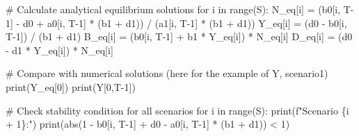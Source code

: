 \documentclass[
  letterpaper,
  DIV=11,
  numbers=noendperiod]{scrreprt}
\newenvironment{Shaded}{\begin{snugshade}}{\end{snugshade}}
\newcommand{\BuiltInTok}[1]{\textcolor[rgb]{0.00,0.23,0.31}{#1}}
\newcommand{\CommentTok}[1]{\textcolor[rgb]{0.37,0.37,0.37}{#1}}
\newcommand{\ControlFlowTok}[1]{\textcolor[rgb]{0.00,0.23,0.31}{#1}}
\newcommand{\DecValTok}[1]{\textcolor[rgb]{0.68,0.00,0.00}{#1}}
\newcommand{\KeywordTok}[1]{\textcolor[rgb]{0.00,0.23,0.31}{#1}}
\newcommand{\NormalTok}[1]{\textcolor[rgb]{0.00,0.23,0.31}{#1}}
\newcommand{\OperatorTok}[1]{\textcolor[rgb]{0.37,0.37,0.37}{#1}}
\newcommand{\SpecialCharTok}[1]{\textcolor[rgb]{0.37,0.37,0.37}{#1}}
\newcommand{\SpecialStringTok}[1]{\textcolor[rgb]{0.13,0.47,0.30}{#1}}
\begin{document}
\begin{tcolorbox}[enhanced jigsaw, titlerule=0mm, breakable, bottomrule=.15mm, toprule=.15mm, colbacktitle=quarto-callout-note-color!10!white, rightrule=.15mm, toptitle=1mm, opacityback=0, left=2mm, coltitle=black, title=\textcolor{quarto-callout-note-color}{\faInfo}\hspace{0.5em}{Python code}, colframe=quarto-callout-note-color-frame, opacitybacktitle=0.6, leftrule=.75mm, bottomtitle=1mm, arc=.35mm, colback=white]

\begin{Shaded}
\begin{Highlighting}[]

\CommentTok{\# Calculate analytical equilibrium solutions }
\ControlFlowTok{for}\NormalTok{ i }\KeywordTok{in} \BuiltInTok{range}\NormalTok{(S):}
\NormalTok{  N\_eq[i] }\OperatorTok{=}\NormalTok{ (b0[i, T}\OperatorTok{{-}}\DecValTok{1}\NormalTok{] }\OperatorTok{{-}}\NormalTok{ d0 }\OperatorTok{+}\NormalTok{ a0[i, T}\OperatorTok{{-}}\DecValTok{1}\NormalTok{] }\OperatorTok{*}\NormalTok{ (b1 }\OperatorTok{+}\NormalTok{ d1)) }\OperatorTok{/}\NormalTok{ (a1[i, T}\OperatorTok{{-}}\DecValTok{1}\NormalTok{] }\OperatorTok{*}\NormalTok{ (b1 }\OperatorTok{+}\NormalTok{ d1))}
\NormalTok{  Y\_eq[i] }\OperatorTok{=}\NormalTok{ (d0 }\OperatorTok{{-}}\NormalTok{ b0[i, T}\OperatorTok{{-}}\DecValTok{1}\NormalTok{]) }\OperatorTok{/}\NormalTok{ (b1 }\OperatorTok{+}\NormalTok{ d1)}
\NormalTok{  B\_eq[i] }\OperatorTok{=}\NormalTok{ (b0[i, T}\OperatorTok{{-}}\DecValTok{1}\NormalTok{] }\OperatorTok{+}\NormalTok{ b1 }\OperatorTok{*}\NormalTok{ Y\_eq[i]) }\OperatorTok{*}\NormalTok{ N\_eq[i]}
\NormalTok{  D\_eq[i] }\OperatorTok{=}\NormalTok{ (d0 }\OperatorTok{{-}}\NormalTok{ d1 }\OperatorTok{*}\NormalTok{ Y\_eq[i]) }\OperatorTok{*}\NormalTok{ N\_eq[i]}
  
\CommentTok{\# Compare with numerical solutions (here for the example of Y, scenario1)}
\BuiltInTok{print}\NormalTok{(Y\_eq[}\DecValTok{0}\NormalTok{])}
\BuiltInTok{print}\NormalTok{(Y[}\DecValTok{0}\NormalTok{,T}\OperatorTok{{-}}\DecValTok{1}\NormalTok{])}

\CommentTok{\# Check stability condition for all scenarios}
\ControlFlowTok{for}\NormalTok{ i }\KeywordTok{in} \BuiltInTok{range}\NormalTok{(S):}
    \BuiltInTok{print}\NormalTok{(}\SpecialStringTok{f"Scenario }\SpecialCharTok{\{}\NormalTok{i }\OperatorTok{+} \DecValTok{1}\SpecialCharTok{\}}\SpecialStringTok{:"}\NormalTok{)}
    \BuiltInTok{print}\NormalTok{(}\BuiltInTok{abs}\NormalTok{(}\DecValTok{1} \OperatorTok{{-}}\NormalTok{ b0[i, T}\OperatorTok{{-}}\DecValTok{1}\NormalTok{] }\OperatorTok{+}\NormalTok{ d0 }\OperatorTok{{-}}\NormalTok{ a0[i, T}\OperatorTok{{-}}\DecValTok{1}\NormalTok{] }\OperatorTok{*}\NormalTok{ (b1 }\OperatorTok{+}\NormalTok{ d1)) }\OperatorTok{\textless{}} \DecValTok{1}\NormalTok{)}
\end{Highlighting}
\end{Shaded}

\end{tcolorbox}
\end{document}
